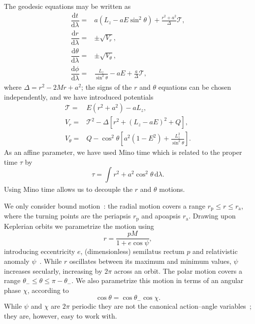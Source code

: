 \documentclass[aps,prd,amsfonts,amssymb,amsmath,nofootinbib,showpacs,superscriptaddress,twocolumn]{revtex4}
\newcommand{\sub}[1]{\ensuremath{_\text{#1}}}
\newcommand{\dd}{\ensuremath{\mathrm{d}}}
\newcommand{\diff}[2]{\ensuremath{\dfrac{\dd {#1}}{\dd {#2}}}}
\newcommand{\intd}[4]{\ensuremath{\int_{#1}^{#2}{#3}\,\dd{#4}}}
\begin{document}
The geodesic equations may be written as~\cite{Carter1968, Chandrasekhar1992} %
\begin{subequations}
\begin{align}
\diff{t}{\lambda} = {} & a\left(L_z - aE\sin^2 \theta\right) + \frac{r^2 + a^2}{\Delta}\mathcal{T},\\
\diff{r}{\lambda} = {} & \pm \sqrt{V_r},\\
\diff{\theta}{\lambda} = {} & \pm \sqrt{V_\theta},\\
\diff{\phi}{\lambda} = {} & \frac{L_z}{\sin^2 \theta} - aE + \frac{a}{\Delta}\mathcal{T},
\end{align}
\end{subequations}
where $\Delta = r^2 - 2M r + a^2$; the signs of the $r$ and $\theta$ equations can be chosen independently, and we have introduced potentials
\begin{subequations}
\begin{align}
\mathcal{T} = {} & E\left(r^2 +a^2\right) - aL_z,\\
V_r = {} & \mathcal{T}^2 - \Delta\left[r^2 + \left(L_z -aE\right)^2 + Q\right],\\
V_\theta = {} & Q - \cos^2 \theta\left[a^2\left(1 - E^2\right) + {\displaystyle \frac{L_z^2}{\sin^2\theta}}\right].
\end{align}
\end{subequations}
As an affine parameter, we have used Mino time which is related to the proper time $\tau$ by~\cite{Mino2003}
\begin{equation}
\tau = \intd{}{}{r^2 + a^2 \cos^2\theta}{\lambda}.
\end{equation}
Using Mino time allows us to decouple the $r$ and $\theta$ motions.

We only consider bound motion~\cite{Wilkins1972}: the radial motion covers a range $r\sub{p} \leq r \leq r\sub{a}$, where the turning points are the periapsis $r\sub{p}$ and apoapsis $r\sub{a}$. Drawing upon Keplerian orbits we parametrize the motion using
\begin{equation}
r = \frac{p M}{1+e\cos\psi},
\end{equation}
introducing eccentricity $e$, (dimensionless) semilatus rectum $p$ and relativistic anomaly $\psi$~\cite{Darwin1961,Drasco2004}. While $r$ oscillates between its maximum and minimum values, $\psi$ increases secularly, increasing by $2\pi$ across an orbit. The polar motion covers a range $\theta_- \leq \theta \leq \pi - \theta_-$. We also parametrize this motion in terms of an angular phase $\chi$, according to~\cite{Hughes2000}
\begin{equation}
\cos\theta = \cos\theta_-\cos\chi.
\end{equation}
While $\psi$ and $\chi$ are $2\pi$ periodic they are not the canonical action--angle variables~\cite{Schmidt2002}; they are, however, easy to work with.
\end{document}
